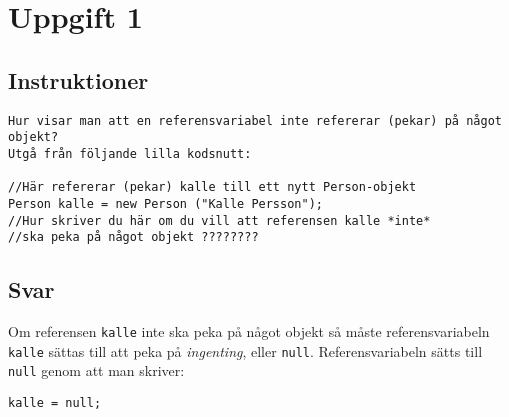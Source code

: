 \section{Uppgift 1}\label{sec:uppg01}

\subsection{Instruktioner}
\begin{Verbatim}[fontsize=\small]
Hur visar man att en referensvariabel inte refererar (pekar) på något objekt?
Utgå från följande lilla kodsnutt:

//Här refererar (pekar) kalle till ett nytt Person-objekt
Person kalle = new Person ("Kalle Persson");
//Hur skriver du här om du vill att referensen kalle *inte*
//ska peka på något objekt ????????
\end{Verbatim}


\subsection{Svar}
Om referensen \texttt{kalle} inte ska peka på något objekt så måste
referensvariabeln \texttt{kalle} sättas till att peka på \emph{ingenting},
eller \texttt{null}.  Referensvariabeln sätts till \texttt{null} genom att man
skriver:
\begin{verbatim}kalle = null;\end{verbatim}

